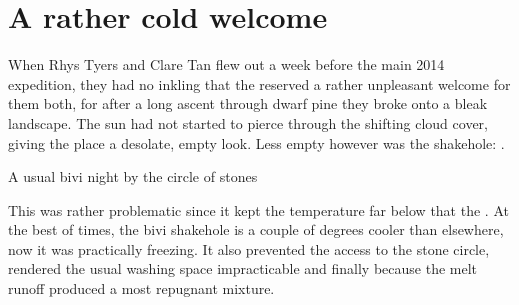 

\section{A rather cold welcome}

When Rhys Tyers and Clare Tan flew out a week before the main 2014 expedition, they had no inkling that the  reserved a rather unpleasant welcome for them both, for after a long ascent through dwarf pine they broke onto a bleak landscape. The sun had not started to pierce through the shifting cloud cover, giving the place a desolate, empty look. Less empty however was the  shakehole: .


\begin{marginfigure}
\caption{A usual bivi night by the circle of stones } \label{}
\end{marginfigure}
This was rather problematic since it kept the  temperature far below that the . At the best of times, the bivi shakehole is a couple of degrees cooler than elsewhere, now it was practically freezing. It also prevented the access to the stone circle, rendered the usual washing space impracticable and finally because the melt runoff produced a most repugnant mixture.

